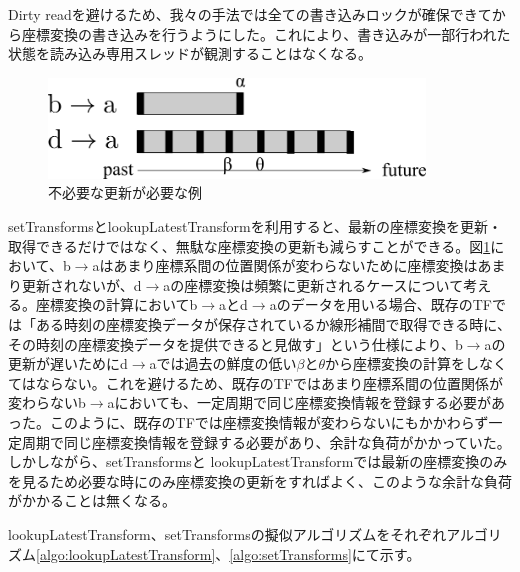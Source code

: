 \documentclass[a4paper]{jreport}	%
\begin{document}
Dirty readを避けるため、我々の手法では全ての書き込みロックが確保できてから座標変換の書き込みを行うようにした。これにより、書き込みが一部行われた状態を読み込み専用スレッドが観測することはなくなる。

\begin{figure}[h] 
\centering
\includegraphics[width=10cm]{need-many-update}
\caption{不必要な更新が必要な例}
\label{fig:need-many-update}
\end{figure}


setTransformsとlookupLatestTransformを利用すると、最新の座標変換を更新・取得できるだけではなく、無駄な座標変換の更新も減らすことができる。図\ref{fig:need-many-update}において、b$\rightarrow$aはあまり座標系間の位置関係が変わらないために座標変換はあまり更新されないが、d$\rightarrow$aの座標変換は頻繁に更新されるケースについて考える。座標変換の計算においてb$\rightarrow$aとd$\rightarrow$aのデータを用いる場合、既存のTFでは「ある時刻の座標変換データが保存されているか線形補間で取得できる時に、その時刻の座標変換データを提供できると見做す」という仕様により、b$\rightarrow$aの更新が遅いためにd$\rightarrow$aでは過去の鮮度の低い$\beta$と$\theta$から座標変換の計算をしなくてはならない。これを避けるため、既存のTFではあまり座標系間の位置関係が変わらないb$\rightarrow$aにおいても、一定周期で同じ座標変換情報を登録する必要があった。このように、既存のTFでは座標変換情報が変わらないにもかかわらず一定周期で同じ座標変換情報を登録する必要があり、余計な負荷がかかっていた。しかしながら、setTransformsと
lookupLatestTransformでは最新の座標変換のみを見るため必要な時にのみ座標変換の更新をすればよく、このような余計な負荷がかかることは無くなる。


lookupLatestTransform、setTransformsの擬似アルゴリズムをそれぞれアルゴリズム\ref{algo:lookupLatestTransform}、\ref{algo:setTransforms}にて示す。
\end{document}
